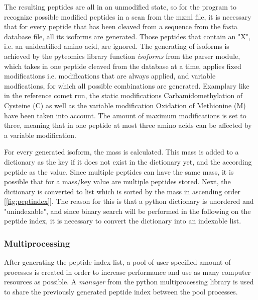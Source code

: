 \documentclass[11pt]{article}
\begin{document}
The resulting peptides are all in an unmodified state, so for the program to recognize possible modified peptides in a scan from the mzml file, it is necessary that for every peptide that has been cleaved from a sequence from the fasta database file, all its isoforms are generated. Those peptides that contain an "X", i.e. an unidentified amino acid, are ignored. The generating of isoforms is achieved by the pyteomics library function \textit{isoforms} from the parser module, which takes in one peptide cleaved from the database at a time, applies fixed modifications i.e. modifications that are always applied, and variable modfications, for which all possible combinations are generated. Examplary like in the reference comet run, the static modifications Carbamidomethylation of Cysteine (C) as well as the variable modification Oxidation of Methionine (M) have been taken into account. The amount of maximum modifications is set to three, meaning that in one peptide at most three amino acids can be affected by a variable modification.

For every generated isoform, the mass is calculated. This mass is added to a dictionary as the key if it does not exist in the dictionary yet, and the according peptide as the value. Since multiple peptides can have the same mass, it is possible that for a mass/key value are multiple peptides stored. Next, the dictionary is converted to list which is sorted by the mass in ascending order [\cref{fig:peptindex}]. The reason for this is that a python dictionary is unordered and "unindexable", and since binary search will be performed in the following on the peptide index, it is necessary to convert the dictionary into an indexable list.
 
\subsubsection{Multiprocessing}
After generating the peptide index list, a pool of user specified amount of processes is created in order to increase performance and use as many computer resources as possible. A \textit{manager} from the python multiprocessing library is used to share the previously generated peptide index between the pool processes. 
\end{document}
